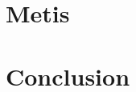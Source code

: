 \documentclass{beamer}
\begin{document}

\section{Metis}

\begin{frame}
\end{frame}



\begin{frame}
\end{frame}



\begin{frame}
\end{frame}




\section{Conclusion}
\end{document}
